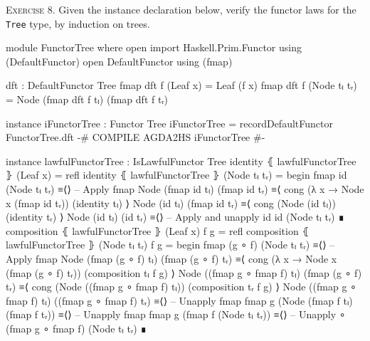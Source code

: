 \documentclass{article}
\begin{document}
\noindent
\textsc{Exercise 8.} Given the instance declaration below, verify the functor laws for the \texttt{Tree} type, by induction on trees.

\begin{code}
module FunctorTree where
  open import Haskell.Prim.Functor using (DefaultFunctor) 
  open DefaultFunctor using (fmap)

  dft : DefaultFunctor Tree
  fmap dft f (Leaf x) = Leaf (f x)
  fmap dft f (Node tₗ tᵣ) = Node (fmap dft f tₗ) (fmap dft f tᵣ)

instance
  iFunctorTree : Functor Tree
  iFunctorTree = record{DefaultFunctor FunctorTree.dft}
  {-# COMPILE AGDA2HS iFunctorTree #-}
\end{code}

\begin{code}
instance
  lawfulFunctorTree : IsLawfulFunctor Tree
  identity ⦃ lawfulFunctorTree ⦄ (Leaf x) = refl
  identity ⦃ lawfulFunctorTree ⦄ (Node tₗ tᵣ) =
    begin
      fmap id (Node tₗ tᵣ)
    ≡⟨⟩ -- Apply fmap
      Node (fmap id tₗ) (fmap id tᵣ)
    ≡⟨ cong (λ x → Node x (fmap id tᵣ)) (identity tₗ) ⟩
      Node (id tₗ) (fmap id tᵣ)
    ≡⟨ cong (Node (id tₗ)) (identity tᵣ) ⟩
      Node (id tₗ) (id tᵣ)
    ≡⟨⟩ -- Apply and unapply id
      id (Node tₗ tᵣ)
    ∎
  composition ⦃ lawfulFunctorTree ⦄ (Leaf x) f g = refl
  composition ⦃ lawfulFunctorTree ⦄ (Node tₗ tᵣ) f g =
    begin
      fmap (g ∘ f) (Node tₗ tᵣ)
    ≡⟨⟩ -- Apply fmap
      Node (fmap (g ∘ f) tₗ) (fmap (g ∘ f) tᵣ)
    ≡⟨ cong (λ x → Node x (fmap (g ∘ f) tᵣ)) (composition tₗ f g) ⟩
      Node ((fmap g ∘ fmap f) tₗ) (fmap (g ∘ f) tᵣ)
    ≡⟨ cong (Node ((fmap g ∘ fmap f) tₗ)) (composition tᵣ f g) ⟩
      Node ((fmap g ∘ fmap f) tₗ) ((fmap g ∘ fmap f) tᵣ)
    ≡⟨⟩ -- Unapply fmap
      fmap g (Node (fmap f tₗ) (fmap f tᵣ))
    ≡⟨⟩ -- Unapply fmap
      fmap g (fmap f (Node tₗ tᵣ))
    ≡⟨⟩ -- Unapply ∘
      (fmap g ∘ fmap f) (Node tₗ tᵣ)
    ∎
\end{code}
\end{document}
